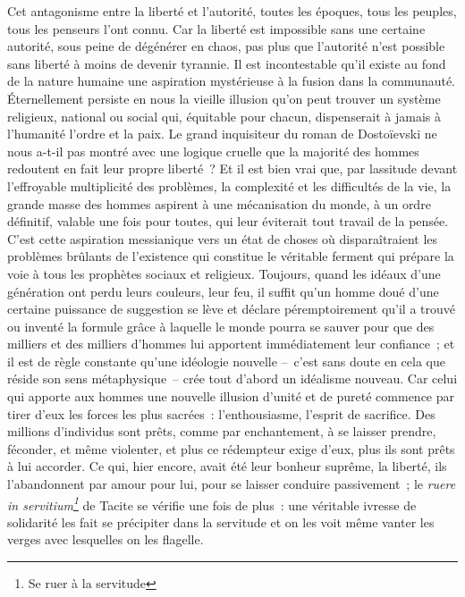 \documentclass[french,twoside]{book} %
\newcommand\foreign[1]{\emph{#1}}
\begin{document}
Cet antagonisme entre la liberté et l’autorité, toutes les époques, tous les peuples, tous les penseurs l’ont connu. Car la liberté est impossible sans une certaine autorité, sous peine de dégénérer en chaos, pas plus que l’autorité n’est possible sans liberté à moins de devenir tyrannie. Il est incontestable qu’il existe au fond de la nature humaine une aspiration mystérieuse à la fusion dans la communauté. Éternellement persiste en nous la vieille illusion qu’on peut trouver un système religieux, national ou social qui, équitable pour chacun, dispenserait à jamais à l’humanité l’ordre et la paix. Le grand inquisiteur du roman de Dostoïevski ne nous a-t-il pas montré avec une logique cruelle que la majorité des hommes redoutent en fait leur propre liberté ? Et il est bien vrai que, par lassitude devant l’effroyable multiplicité des problèmes, la complexité et les difficultés de la vie, la grande masse des hommes aspirent à une mécanisation du monde, à un ordre définitif, valable une fois pour toutes, qui leur éviterait tout travail de la pensée. C’est cette aspiration messianique vers un état de choses où disparaîtraient les problèmes brûlants de l’existence qui constitue le véritable ferment qui prépare la voie à tous les prophètes sociaux et religieux. Toujours, quand les idéaux d’une génération ont perdu leurs couleurs, leur feu, il suffit qu’un homme doué d’une certaine puissance de suggestion se lève et déclare péremptoirement qu’il a trouvé ou inventé la formule grâce à laquelle le monde pourra se sauver pour que des milliers et des milliers d’hommes lui apportent immédiatement leur confiance ; et il est de règle constante qu’une idéologie nouvelle – c’est sans doute en cela que réside son sens métaphysique – crée tout d’abord un idéalisme nouveau. Car celui qui apporte aux hommes une nouvelle illusion d’unité et de pureté commence par tirer d’eux les forces les plus sacrées : l’enthousiasme, l’esprit de sacrifice. Des millions d’individus sont prêts, comme par enchantement, à se laisser prendre, féconder, et même violenter, et plus ce rédempteur exige d’eux, plus ils sont prêts à lui accorder. Ce qui, hier encore, avait été leur bonheur suprême, la liberté, ils l’abandonnent par amour pour lui, pour se laisser conduire passivement ; le \foreign{ruere in servitium\footnote{Se ruer à la servitude}} de Tacite se vérifie une fois de plus : une véritable ivresse de solidarité les fait se précipiter dans la servitude et on les voit même vanter les verges avec lesquelles on les flagelle.\par
\end{document}
